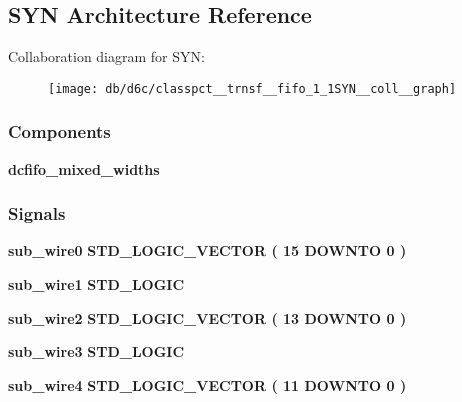 \subsection{S\+YN Architecture Reference}
\label{classpct__trnsf__fifo_1_1SYN}


Collaboration diagram for S\+YN\+:\nopagebreak
\begin{figure}[H]
\begin{center}
\leavevmode
\texttt{[image: db/d6c/classpct\_\_trnsf\_\_fifo\_1\_1SYN\_\_coll\_\_graph]}
\end{center}
\end{figure}
\subsubsection*{Components}
 \begin{DoxyCompactItemize}
\item 
{\bf dcfifo\+\_\+mixed\+\_\+widths}  {\bfseries }  
\end{DoxyCompactItemize}
\subsubsection*{Signals}
 \begin{DoxyCompactItemize}
\item 
{\bf sub\+\_\+wire0} {\bfseries \textcolor{comment}{S\+T\+D\+\_\+\+L\+O\+G\+I\+C\+\_\+\+V\+E\+C\+T\+OR}\textcolor{vhdlchar}{ }\textcolor{vhdlchar}{(}\textcolor{vhdlchar}{ }\textcolor{vhdlchar}{ } \textcolor{vhdldigit}{15} \textcolor{vhdlchar}{ }\textcolor{keywordflow}{D\+O\+W\+N\+TO}\textcolor{vhdlchar}{ }\textcolor{vhdlchar}{ } \textcolor{vhdldigit}{0} \textcolor{vhdlchar}{ }\textcolor{vhdlchar}{)}\textcolor{vhdlchar}{ }} 
\item 
{\bf sub\+\_\+wire1} {\bfseries \textcolor{comment}{S\+T\+D\+\_\+\+L\+O\+G\+IC}\textcolor{vhdlchar}{ }} 
\item 
{\bf sub\+\_\+wire2} {\bfseries \textcolor{comment}{S\+T\+D\+\_\+\+L\+O\+G\+I\+C\+\_\+\+V\+E\+C\+T\+OR}\textcolor{vhdlchar}{ }\textcolor{vhdlchar}{(}\textcolor{vhdlchar}{ }\textcolor{vhdlchar}{ } \textcolor{vhdldigit}{13} \textcolor{vhdlchar}{ }\textcolor{keywordflow}{D\+O\+W\+N\+TO}\textcolor{vhdlchar}{ }\textcolor{vhdlchar}{ } \textcolor{vhdldigit}{0} \textcolor{vhdlchar}{ }\textcolor{vhdlchar}{)}\textcolor{vhdlchar}{ }} 
\item 
{\bf sub\+\_\+wire3} {\bfseries \textcolor{comment}{S\+T\+D\+\_\+\+L\+O\+G\+IC}\textcolor{vhdlchar}{ }} 
\item 
{\bf sub\+\_\+wire4} {\bfseries \textcolor{comment}{S\+T\+D\+\_\+\+L\+O\+G\+I\+C\+\_\+\+V\+E\+C\+T\+OR}\textcolor{vhdlchar}{ }\textcolor{vhdlchar}{(}\textcolor{vhdlchar}{ }\textcolor{vhdlchar}{ } \textcolor{vhdldigit}{11} \textcolor{vhdlchar}{ }\textcolor{keywordflow}{D\+O\+W\+N\+TO}\textcolor{vhdlchar}{ }\textcolor{vhdlchar}{ } \textcolor{vhdldigit}{0} \textcolor{vhdlchar}{ }\textcolor{vhdlchar}{)}\textcolor{vhdlchar}{ }} 
\end{DoxyCompactItemize}
